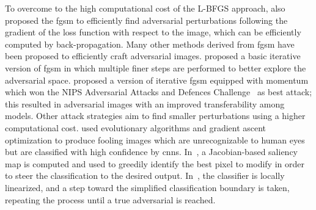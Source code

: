 To overcome to the high computational cost of the L-BFGS approach, \citet{goodfellow2014explaining} also proposed the \gls{fgsm} to efficiently find adversarial perturbations following the gradient of the loss function with respect to the image, which can be efficiently computed by back-propagation.
Many other methods derived from \gls{fgsm} have been proposed to efficiently craft adversarial images.
\citet{kurakin2016adversarial} proposed a basic iterative version of \gls{fgsm} in which multiple finer steps are performed to better explore the adversarial space.
\citet{dong2018boosting} proposed a version of iterative \gls{fgsm} equipped with momentum which won the NIPS Adversarial Attacks and Defences Challenge~\cite{kurakin2018adversarial} as best attack;
this resulted in adversarial images with an improved transferability among models.
Other attack strategies aim to find smaller perturbations using a higher computational cost.
\citet{nguyen2015deep} used evolutionary algorithms and gradient ascent optimization to produce fooling images which are unrecognizable to human eyes but are classified with high confidence by \glspl{cnn}.
In~\cite{papernot2016limitations}, a Jacobian-based saliency map is computed and used to greedily identify the best pixel to modify in order to steer the classification to the desired output.
In~\cite{moosavi2016deepfool}, the classifier is locally linearized, and a step toward the simplified classification boundary is taken, repeating the process until a true adversarial is reached.
